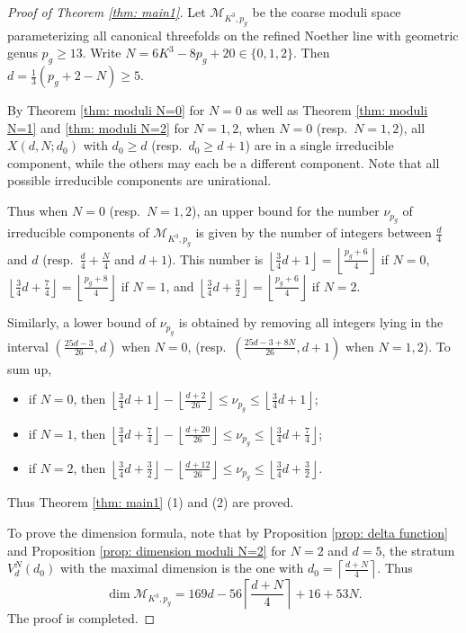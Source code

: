 \documentclass[a4paper,11pt]{amsart}
\newcommand{\M}{\ensuremath{\mathcal{M}}}
\theoremstyle{definition}
\theoremstyle{remark}
\numberwithin{equation}{section}
\begin{document}
\begin{proof}[Proof of Theorem \ref{thm: main1}]
    Let $\M_{K^3, p_g}$ be the coarse moduli space parameterizing all canonical threefolds on the refined Noether line with geometric genus $p_g \ge 13$. Write $N = 6K^3 - 8p_g + 20 \in \{0, 1, 2\}$. Then $d = \frac13 (p_g + 2 - N) \ge 5$.
    
    By Theorem \ref{thm: moduli N=0} for $N = 0$ as well as Theorem \ref{thm: moduli N=1} and \ref{thm: moduli N=2} for $N = 1, 2$, when $N = 0$ (resp.~$N = 1, 2$), all $X(d, N; d_0)$ with $d_0 \geq d$ (resp.~$d_0 \ge d + 1$) are in a single irreducible component, while the others may each be a different component. Note that all possible irreducible components are unirational. 
    
    Thus when $N = 0$ (resp.~$N = 1, 2$), an upper bound for the number $\nu_{p_g}$ of irreducible components of $\M_{K^3, p_g}$ is given by the number of integers between $\frac{d}4$ and $d$ (resp.~$\frac{d}4 + \frac N4$ and $d + 1$). This number is $\left \lfloor \frac34 d + 1\right \rfloor=\left \lfloor \frac{p_g+6}4\right \rfloor$ if $N=0$, $\left \lfloor \frac34 d + \frac74\right \rfloor = \left \lfloor \frac{p_g+8}4\right \rfloor$ if $N=1$, and $\left \lfloor \frac34 d + \frac32\right \rfloor = \left\lfloor \frac{p_g+6}4\right \rfloor$ if $N=2$.
    
    Similarly, a lower bound of $\nu_{p_g}$ is obtained by removing all integers lying in the interval $\left(\frac{25d - 3}{26}, d\right)$ when $N = 0$, (resp.~$\left(\frac{25d - 3 + 8N}{26}, d + 1\right)$ when $N = 1, 2$). To sum up, 
    \begin{itemize}
        \item if $N = 0$, then $\left \lfloor \frac34 d + 1\right \rfloor - \left \lfloor \frac{d + 2}{26}\right \rfloor \le \nu_{p_g} \le \left \lfloor \frac34 d + 1\right \rfloor$;

        \item if $N = 1$, then $\left \lfloor \frac34 d + \frac74\right \rfloor - \left \lfloor \frac{d + 20}{26}\right \rfloor \le \nu_{p_g} \le \left \lfloor \frac34 d + \frac74\right \rfloor$;

        \item if $N = 2$, then $\left \lfloor \frac34 d + \frac32\right \rfloor - \left \lfloor \frac{d + 12}{26}\right \rfloor \le \nu_{p_g} \le \left \lfloor \frac34 d + \frac32\right \rfloor$.
    \end{itemize}
    Thus Theorem \ref{thm: main1} (1) and (2) are proved.

    To prove the dimension formula, note that by Proposition \ref{prop: delta function} and Proposition \ref{prop: dimension moduli N=2} for $N = 2$ and $d = 5$, the stratum $V^N_d(d_0)$ with the maximal dimension is the one with $d_0 = \left \lceil \frac{d + N}4\right \rceil$. Thus 
    $$
    \dim \M_{K^3, p_g} = 169d - 56 \left \lceil \frac{d + N}4\right \rceil + 16 + 53N.
    $$
    The proof is completed.
\end{proof}
\end{document}
